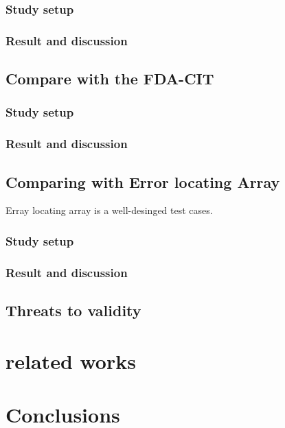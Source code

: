 \documentclass{sig-alternate}
\begin{document}
\subsubsection{Study setup}

\subsubsection{Result and discussion}

\subsection{Compare with the FDA-CIT}

\subsubsection{Study setup}


\subsubsection{Result and discussion}


\subsection{Comparing with Error locating Array}
Erray locating array is a well-desinged test cases.
\subsubsection{Study setup}



\subsubsection{Result and discussion}


\subsection{Threats to validity}


\section{related works}


\section{Conclusions}
\end{document}
